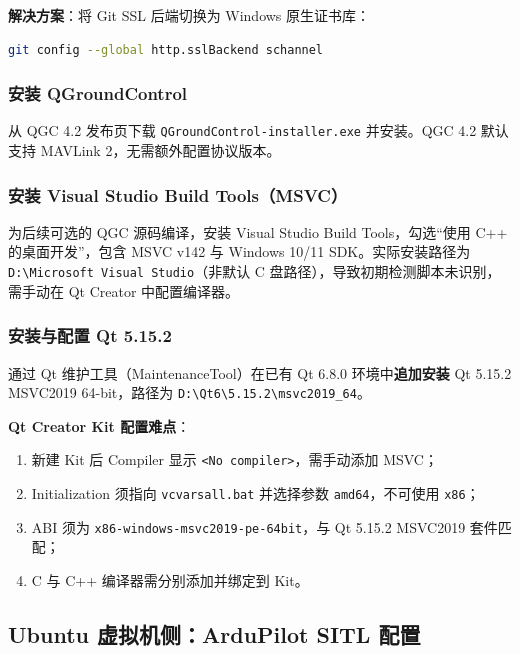 \documentclass[12pt,a4paper]{article}
\begin{document}
\textbf{解决方案}：将 Git SSL 后端切换为 Windows 原生证书库：
\begin{lstlisting}[language=bash]
git config --global http.sslBackend schannel
\end{lstlisting}

\subsubsection{安装 QGroundControl}

从 QGC 4.2 发布页下载 \texttt{QGroundControl-installer.exe} 并安装。QGC 4.2 默认支持 MAVLink 2，无需额外配置协议版本。

\subsubsection{安装 Visual Studio Build Tools（MSVC）}

为后续可选的 QGC 源码编译，安装 Visual Studio Build Tools，勾选“使用 C++ 的桌面开发”，包含 MSVC v142 与 Windows 10/11 SDK。实际安装路径为 \texttt{D:\textbackslash Microsoft Visual Studio}（非默认 C 盘路径），导致初期检测脚本未识别，需手动在 Qt Creator 中配置编译器。

\subsubsection{安装与配置 Qt 5.15.2}

通过 Qt 维护工具（MaintenanceTool）在已有 Qt 6.8.0 环境中\textbf{追加安装} Qt 5.15.2 MSVC2019 64-bit，路径为 \texttt{D:\textbackslash Qt6\textbackslash 5.15.2\textbackslash msvc2019\_64}。

\textbf{Qt Creator Kit 配置难点}：
\begin{enumerate}[leftmargin=2em]
    \item 新建 Kit 后 Compiler 显示 \texttt{<No compiler>}，需手动添加 MSVC；
    \item Initialization 须指向 \texttt{vcvarsall.bat} 并选择参数 \texttt{amd64}，不可使用 \texttt{x86}；
    \item ABI 须为 \texttt{x86-windows-msvc2019-pe-64bit}，与 Qt 5.15.2 MSVC2019 套件匹配；
    \item C 与 C++ 编译器需分别添加并绑定到 Kit。
\end{enumerate}

\subsection{Ubuntu 虚拟机侧：ArduPilot SITL 配置}
\end{document}
